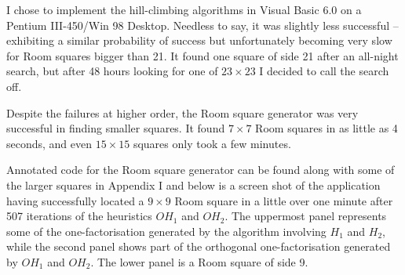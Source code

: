 I chose to implement the hill-climbing algorithms in Visual Basic
6.0 on a Pentium III-450/Win 98 Desktop. Needless to say, it was
slightly less successful – exhibiting a similar probability of
success but unfortunately becoming very slow for Room squares
bigger than 21. It found one square of side 21 after an all-night
search, but after 48 hours looking for one of
$23 \times 23$
I decided to
call the search off.

Despite the failures at higher order, the Room square generator
was very successful in finding smaller squares. It found
$7 \times 7$
Room squares in as little as 4 seconds, and even
$15 \times 15$
squares only took a few minutes.

Annotated code for the Room square generator can be found along
with some of the larger squares in Appendix I and below is a
screen shot of the application having successfully located a 
$9 \times 9$
Room square in a little over one minute after 507 iterations of
the heuristics $OH_1$ and $OH_2$. The uppermost panel represents
some of the one-factorisation generated by the algorithm involving
$H_1$ and $H_2$, while the second panel shows part of the
orthogonal one-factorisation generated by $OH_1$ and $OH_2$. The
lower panel is a Room square of side 9.

